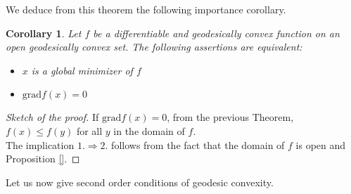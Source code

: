 \documentclass[10pt,a4paper]{book}
\theoremstyle{definition}
\theoremstyle{plain}
\newtheorem{cor}{Corollary}[section]
\theoremstyle{remark}
\newcommand{\grad}{\textrm{grad}}
\begin{document}
We deduce from this theorem the following importance corollary.
\begin{cor}
Let $f$ be a differentiable and geodesically convex function on an open geodesically convex set. The following assertions are equivalent:
\begin{itemize}
\item[(i)] $x$ is a global minimizer of $f$
\item[(ii)] $\grad f(x)=0$
\end{itemize}
\end{cor}
\begin{proof}[Sketch of the proof]
If $\grad f(x)=0$, from the previous Theorem, $f(x)\le f(y)$ for all $y$ in the domain of $f$. \\ The implication $1. \Rightarrow 2.$ follows from the fact that the domain of $f$ is open and Proposition \ref{}.
\end{proof}
Let us now give second order conditions of geodesic convexity.
\end{document}
